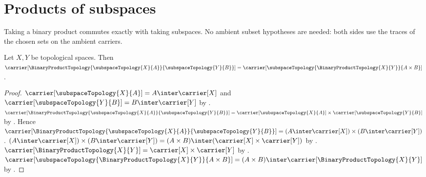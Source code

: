 \section{Products of subspaces}




Taking a binary product commutes exactly with taking subspaces.  No ambient
subset hypotheses are needed: both sides use the traces of the chosen sets on
the ambient carriers.

\begin{proposition}\label{product_subspace_carriers_agree}
    Let $X,Y$ be topological spaces.
    Then
        $\carrier[\BinaryProductTopology{
            \subspaceTopology{X}{A}}{\subspaceTopology{Y}{B}}]
        =\carrier[\subspaceTopology{
            \BinaryProductTopology{X}{Y}}{A\times B}]$.
\end{proposition}
\begin{proof}
    $\carrier[\subspaceTopology{X}{A}]=A\inter\carrier[X]$ and
        $\carrier[\subspaceTopology{Y}{B}]=B\inter\carrier[Y]$ by
        .
    $\carrier[\BinaryProductTopology{
        \subspaceTopology{X}{A}}{\subspaceTopology{Y}{B}}]
        =\carrier[\subspaceTopology{X}{A}]\times
            \carrier[\subspaceTopology{Y}{B}]$ by
        .
    Hence $\carrier[\BinaryProductTopology{
        \subspaceTopology{X}{A}}{\subspaceTopology{Y}{B}}]
        =(A\inter\carrier[X])\times(B\inter\carrier[Y])$.
    $(A\inter\carrier[X])\times(B\inter\carrier[Y])
        =(A\times B)\inter(\carrier[X]\times\carrier[Y])$ by
        .
    $\carrier[\BinaryProductTopology{X}{Y}]
        =\carrier[X]\times\carrier[Y]$ by
        .
    $\carrier[\subspaceTopology{
        \BinaryProductTopology{X}{Y}}{A\times B}]
        =(A\times B)\inter
            \carrier[\BinaryProductTopology{X}{Y}]$ by
        .
\end{proof}

